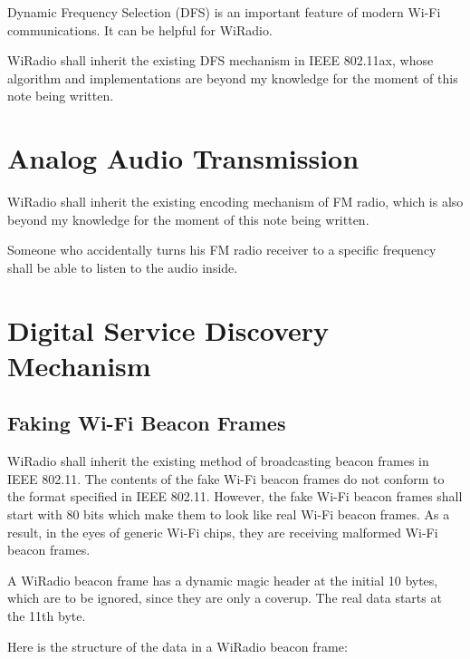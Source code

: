 \documentclass[a4paper,11pt]{article}
\begin{document}
Dynamic Frequency Selection (DFS) is an important feature of modern Wi-Fi communications.
It can be helpful for WiRadio.

WiRadio shall inherit the existing DFS mechanism in IEEE 802.11ax,
whose algorithm and implementations are beyond my knowledge for the moment of this note being written.



\section{Analog Audio Transmission}

WiRadio shall inherit the existing encoding mechanism of FM radio,
which is also beyond my knowledge for the moment of this note being written.

Someone who accidentally turns his FM radio receiver to a specific frequency
shall be able to listen to the audio inside.



\section{Digital Service Discovery Mechanism}

\subsection{Faking Wi-Fi Beacon Frames}

WiRadio shall inherit the existing method of broadcasting beacon frames in IEEE 802.11.
The contents of the fake Wi-Fi beacon frames do not conform to the format specified in IEEE 802.11.
However, the fake Wi-Fi beacon frames shall start with 80 bits which make them to look like real Wi-Fi beacon frames.
As a result, in the eyes of generic Wi-Fi chips, they are receiving malformed Wi-Fi beacon frames.

A WiRadio beacon frame has a dynamic magic header at the initial 10 bytes, which are to be ignored, since they are only a coverup.
The real data starts at the 11th byte.

Here is the structure of the data in a WiRadio beacon frame:
\end{document}
